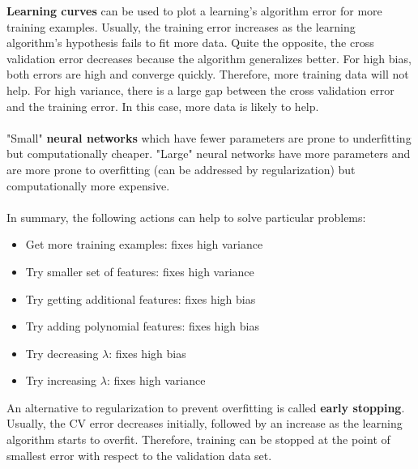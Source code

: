 \documentclass{report}
\begin{document}
{\bf Learning curves} can be used to plot a learning's algorithm error for more training examples. Usually, the training error increases as the learning algorithm's hypothesis fails to fit more data. Quite the opposite, the cross validation error decreases because the algorithm generalizes better. For high bias, both errors are high and converge quickly. Therefore, more training data will not help. For high variance, there is a large gap between the cross validation error and the training error. In this case, more data is likely to help.
\\ \\
"Small" {\bf neural networks} which have fewer parameters are prone to underfitting but computationally cheaper. "Large" neural networks have more parameters and are more prone to overfitting (can be addressed by regularization) but computationally more expensive.
\\ \\
In summary, the following actions can help to solve particular problems:
\begin{itemize}
\item Get more training examples: fixes high variance
\item Try smaller set of features: fixes high variance
\item Try getting additional features: fixes high bias
\item Try adding polynomial features: fixes high bias
\item Try decreasing $\lambda$: fixes high bias
\item Try increasing $\lambda$: fixes high variance
\end{itemize}

An alternative to regularization to prevent overfitting is called {\bf early stopping}.
Usually, the CV error decreases initially, followed by an increase as the learning algorithm starts to overfit.
Therefore, training can be stopped at the point of smallest error with respect to the validation data set.
\end{document}
